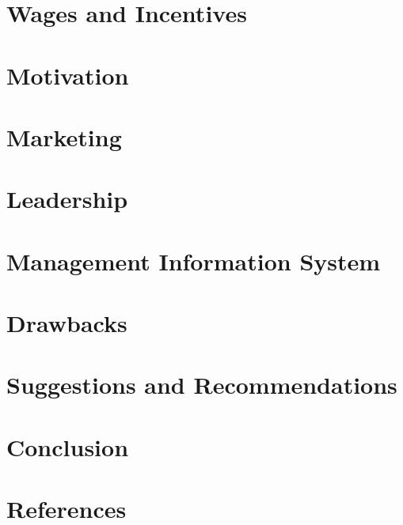 \documentclass[12pt, a4paper]{article}
\begin{document}
	\section{Wages and Incentives}
	\cleardoublepage
	\section{Motivation}
	\cleardoublepage
	\section{Marketing}
	\cleardoublepage
	\section{Leadership}
	\cleardoublepage
	\section{Management Information System}
	\cleardoublepage
	\section{Drawbacks}
	\cleardoublepage
	\section{Suggestions and Recommendations}
	\cleardoublepage
	\section{Conclusion}
	\cleardoublepage
	\section{References}
	\cleardoublepage
\end{document}
